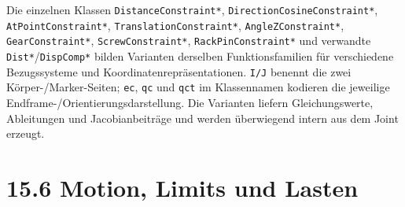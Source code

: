 \documentclass[
  12pt
]{book}
\begin{document}
Die einzelnen Klassen \texttt{DistanceConstraint*},
\texttt{DirectionCosineConstraint*}, \texttt{AtPointConstraint*},
\texttt{TranslationConstraint*}, \texttt{AngleZConstraint*},
\texttt{GearConstraint*}, \texttt{ScrewConstraint*},
\texttt{RackPinConstraint*} und verwandte
\texttt{Dist*}/\texttt{DispComp*} bilden Varianten derselben
Funktionsfamilien für verschiedene Bezugssysteme und
Koordinatenrepräsentationen. \texttt{I/J} benennt die zwei
Körper-/Marker-Seiten; \texttt{ec}, \texttt{qc} und \texttt{qct} im
Klassennamen kodieren die jeweilige Endframe-/Orientierungsdarstellung.
Die Varianten liefern Gleichungswerte, Ableitungen und Jacobianbeiträge
und werden überwiegend intern aus dem Joint erzeugt.

\hypertarget{abs-api-motion-limits-lasten}{%
\section{\texorpdfstring{{15.6} Motion, Limits und
Lasten}{15.6 Motion, Limits und Lasten}}\label{abs-api-motion-limits-lasten}}
\end{document}
